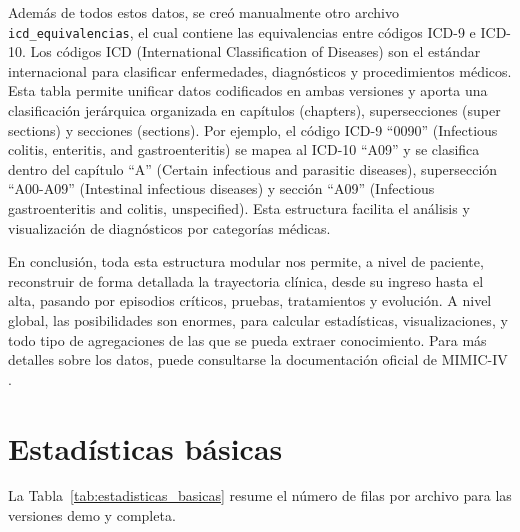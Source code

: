 Además de todos estos datos, se creó manualmente otro archivo \texttt{icd\_equivalencias}, el cual contiene las equivalencias entre códigos ICD-9 e ICD-10. Los códigos ICD (International Classification of Diseases) son el estándar internacional para clasificar enfermedades, diagnósticos y procedimientos médicos. Esta tabla permite unificar datos codificados en ambas versiones y aporta una clasificación jerárquica organizada en capítulos (chapters), supersecciones (super sections) y secciones (sections). Por ejemplo, el código ICD-9 ``0090'' (Infectious colitis, enteritis, and gastroenteritis) se mapea al ICD-10 ``A09'' y se clasifica dentro del capítulo ``A'' (Certain infectious and parasitic diseases), supersección ``A00-A09'' (Intestinal infectious diseases) y sección ``A09'' (Infectious gastroenteritis and colitis, unspecified). Esta estructura facilita el análisis y visualización de diagnósticos por categorías médicas.

En conclusión, toda esta estructura modular nos permite, a nivel de paciente, reconstruir de forma detallada la trayectoria clínica, desde su ingreso hasta el alta, pasando por episodios críticos, pruebas, tratamientos y evolución. A nivel global, las posibilidades son enormes, para calcular estadísticas, visualizaciones, y todo tipo de agregaciones de las que se pueda extraer conocimiento. Para más detalles sobre los datos, puede consultarse la documentación oficial de MIMIC-IV \cite{MIMICIV_docs}.

\section{Estadísticas básicas}

La Tabla~\ref{tab:estadisticas_basicas} resume el número de filas por archivo para las versiones demo y completa.

